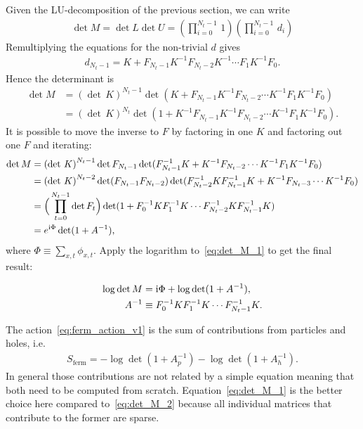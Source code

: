 \documentclass[a4paper, fleqn, twoside, notitlepage]{scrartcl}
\begin{document}
Given the LU-decomposition of the previous section, we can write
\begin{align}
  \det M = \det L \det U = (\prod_{i=0}^{N_t-1}\,1) (\prod_{i=0}^{N_t-1}\,d_i)
\end{align}
Remultiplying the equations for the non-trivial $d$ gives
\begin{align}
  d_{N_t-1} = K + F_{N_t-1}K^{-1} F_{N_t-2}K^{-1} \cdots F_{1}K^{-1} F_{0}.
\end{align}
Hence the determinant is
\begin{align}
  \det M &= {(\det\,K)}^{N_t-1} \det (K + F_{N_t-1}K^{-1} F_{N_t-2} \cdots K^{-1}F_{1}K^{-1} F_{0})\\
         &= {(\det\,K)}^{N_t} \det(1 + K^{-1}F_{N_t-1}K^{-1} F_{N_t-2} \cdots K^{-1}F_{1}K^{-1} F_{0}).\label{eq:det_M_2}
\end{align}
It is possible to move the inverse to $F$ by factoring in one $K$ and factoring out one $F$ and iterating:
\begin{align}
  \det M &= {(\det\,K)}^{N_t-1} \det F_{N_t-1} \det(F_{N_t-1}^{-1} K + K^{-1} F_{N_t-2} \cdots K^{-1}F_{1}K^{-1} F_{0})\\
         &= {(\det\,K)}^{N_t-2} \det (F_{N_t-1} F_{N_t-2}) \det(F_{N_t-2}^{-1} K F_{N_t-1}^{-1} K + K^{-1} F_{N_t-3} \cdots K^{-1} F_{0})\\
         &= \Big(\prod_{t=0}^{N_t-1} \det F_{t}\Big) \det(1 + F_0^{-1} K F_1^{-1} K \cdots F_{N_t-2}^{-1} K F_{N_t-1}^{-1} K)\\
         &= e^{\mathrm{i} \Phi} \det(1 + A^{-1}),\label{eq:det_M_1}
\end{align}
where $\Phi \equiv \sum_{x,t} \phi_{x,t}$.
Apply the logarithm to~\eqref{eq:det_M_1} to get the final result:
\begin{resultbox}
  \vspace{-\baselineskip}
  \begin{align}
    \log \det M &= \mathrm{i} \Phi  + \log \det (1 + A^{-1}),\label{eq:det_M}\\
    A^{-1} &\equiv F_0^{-1}K F_1^{-1}K \cdots F_{N_t-1}^{-1}K.\label{eq:def_Ainv}
  \end{align}
\end{resultbox}
\noindent
The action~\eqref{eq:ferm_action_v1} is the sum of contributions from particles and holes, i.e.
\begin{align}
  S_\text{ferm} = - \log \det (1 + A_p^{-1}) - \log \det (1 + A_h^{-1}).
\end{align}
In general those contributions are not related by a simple equation meaning that both need to be computed from scratch. Equation~\eqref{eq:det_M_1} is the better choice here compared to~\eqref{eq:det_M_2} because all individual matrices that contribute to the former are sparse.\\
\end{document}
